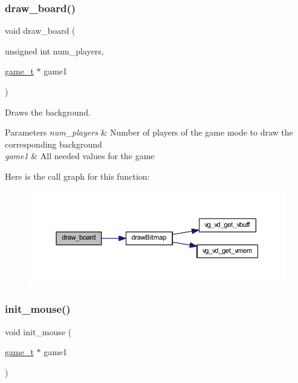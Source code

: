 \subsubsection{\texorpdfstring{draw\+\_\+board()}{draw\_board()}}
{\footnotesize\ttfamily void draw\+\_\+board (\begin{DoxyParamCaption}\item[{unsigned int}]{num\+\_\+players,  }\item[{\hyperlink{structgame__t}{game\+\_\+t} $\ast$}]{game1 }\end{DoxyParamCaption})}



Draws the background. 


\begin{DoxyParams}{Parameters}
{\em num\+\_\+players} & Number of players of the game mode to draw the corresponding background \\
\hline
{\em game1} & All needed values for the game \\
\hline
\end{DoxyParams}
Here is the call graph for this function\+:
\nopagebreak
\begin{figure}[H]
\begin{center}
\leavevmode
\includegraphics[width=350pt]{group___game_ga1904435b0a61ef11d90bec5376eb6398_cgraph}
\end{center}
\end{figure}
\hypertarget{group___game_ga97a9584ff1d8b78ede18e32bf5a7bd50}{}\label{group___game_ga97a9584ff1d8b78ede18e32bf5a7bd50} 
\subsubsection{\texorpdfstring{init\+\_\+mouse()}{init\_mouse()}}
{\footnotesize\ttfamily void init\+\_\+mouse (\begin{DoxyParamCaption}\item[{\hyperlink{structgame__t}{game\+\_\+t} $\ast$}]{game1 }\end{DoxyParamCaption})}



